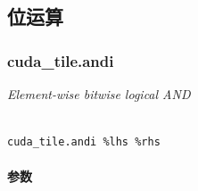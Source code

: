 \documentclass{article}
\begin{document}
\subsection{位运算}


\subsubsection{cuda\_tile.andi}


\textit{Element-wise bitwise logical AND}




\begin{lstlisting}

cuda_tile.andi %lhs %rhs

\end{lstlisting}



\paragraph{参数}
\end{document}
